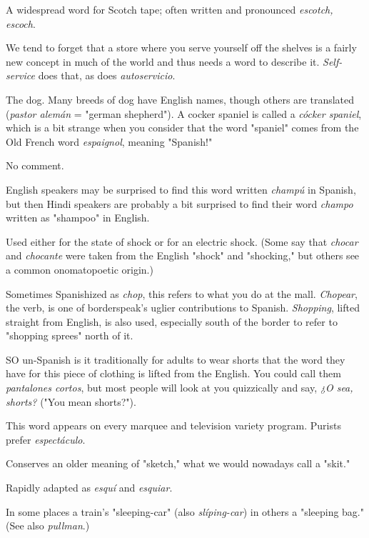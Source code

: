  A widespread word for Scotch tape; often written
and pronounced \emph{escotch, escoch}.

 We tend to forget that a store where you serve
yourself off the shelves is a fairly new concept in much of the world
and thus needs a word to describe it. \emph{Self-service} does that, as does
\emph{autoservicio}.

 The dog. Many breeds of dog have English names,
though others are translated (\emph{pastor alemán} = "german shepherd"). A
cocker spaniel is called a \emph{cócker spaniel}, which is a bit strange when
you consider that the word "spaniel" comes from the Old French word
\emph{espaignol}, meaning "Spanish!"

 No comment.

 English speakers may be surprised to find this
word written \emph{champú} in Spanish, but then Hindi speakers are probably
a bit surprised to find their word \emph{champo} written as "shampoo" in
English.

 Used either for the state of shock or for an electric
shock. (Some say that \emph{chocar} and \emph{chocante} were taken from the English "shock" and "shocking," but others see a common onomatopoetic origin.)

 Sometimes Spanishized as \emph{chop}, this refers to what
you do at the mall. \emph{Chopear}, the verb, is one of borderspeak's uglier
contributions to Spanish. \emph{Shopping}, lifted straight from English, is also
used, especially south of the border to refer to "shopping sprees" north
of it.

 SO un-Spanish is it traditionally for adults to wear
shorts that the word they have for this piece of clothing is lifted
from the English. You could call them \emph{pantalones cortos}, but most
people will look at you quizzically and say, \emph{¿O sea, shorts?} ("You mean
shorts?").

 This word appears on every marquee and television
variety program. Purists prefer \emph{espectáculo}.

 Conserves an older meaning of "sketch," what we
would nowadays call a "skit."

 Rapidly adapted as \emph{esquí} and \emph{esquiar}.

 In some places a train's "sleeping-car" (also
\emph{slíping-car}) in others a "sleeping bag." (See also \emph{pullman}.)

